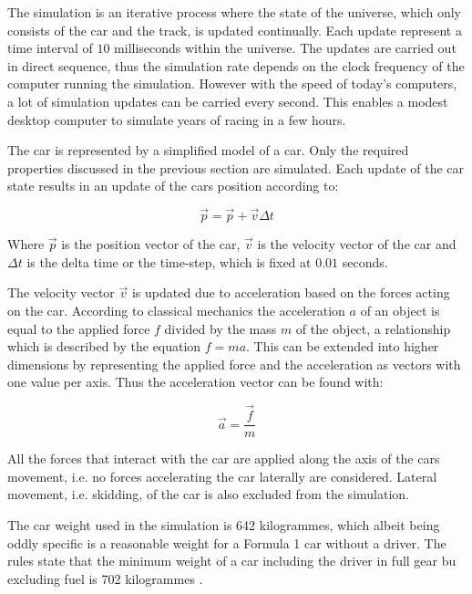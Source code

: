 The simulation is an iterative process where the state of the universe, which only consists of the car and the track, is updated continually. Each update represent a time interval of $10$ milliseconds within the universe. The updates are carried out in direct sequence, thus the simulation rate depends on the clock frequency of the computer running the simulation. However with the speed of today's computers, a lot of simulation updates can be carried every second. This enables a modest desktop computer to simulate years of racing in a few hours. 

The car is represented by a simplified model of a car. Only the required properties discussed in the previous section are simulated. Each update of the car state results in an update of the cars position according to:

\begin{equation}
    \vec{p} = \vec{p} + \vec{v}\Delta t 
\end{equation}

Where $\vec{p}$ is the position vector of the car, $\vec{v}$ is the velocity vector of the car and $\Delta t$ is the delta time or the time-step, which is fixed at $0.01$ seconds.

The velocity vector $\vec{v}$ is updated due to acceleration based on the forces acting on the car. According to classical mechanics the acceleration $a$ of an object is equal to the applied force $f$ divided by the mass $m$ of the object, a relationship which is described by the equation $f = ma$. This can be extended into higher dimensions by representing the applied force and the acceleration as vectors with one value per axis. Thus the acceleration vector can be found with:

\begin{equation}
    \vec{a} = \frac{\vec{f}}{m}  
\end{equation}

All the forces that interact with the car are applied along the axis of the cars movement, i.e. no forces accelerating the car laterally are considered. Lateral movement, i.e. skidding, of the car is also excluded from the simulation. 


The car weight used in the simulation is 642 kilogrammes, which albeit being oddly specific is a reasonable weight for a Formula 1 car without a driver. The rules state that the minimum weight of a car including the driver in full gear bu excluding fuel is 702 kilogrammes \cite{f1_weight}.

